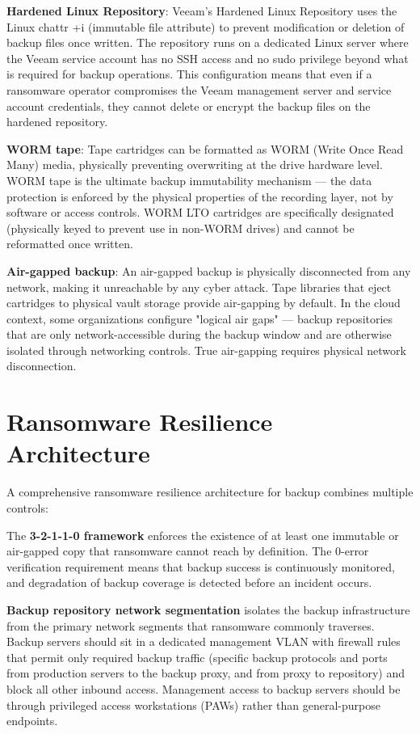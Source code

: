 \textbf{Hardened Linux Repository}: Veeam's Hardened Linux Repository uses the Linux chattr +i (immutable file attribute) to prevent modification or deletion of backup files once written. The repository runs on a dedicated Linux server where the Veeam service account has no SSH access and no sudo privilege beyond what is required for backup operations. This configuration means that even if a ransomware operator compromises the Veeam management server and service account credentials, they cannot delete or encrypt the backup files on the hardened repository.

\textbf{WORM tape}: Tape cartridges can be formatted as WORM (Write Once Read Many) media, physically preventing overwriting at the drive hardware level. WORM tape is the ultimate backup immutability mechanism --- the data protection is enforced by the physical properties of the recording layer, not by software or access controls. WORM LTO cartridges are specifically designated (physically keyed to prevent use in non-WORM drives) and cannot be reformatted once written.

\textbf{Air-gapped backup}: An air-gapped backup is physically disconnected from any network, making it unreachable by any cyber attack. Tape libraries that eject cartridges to physical vault storage provide air-gapping by default. In the cloud context, some organizations configure "logical air gaps" --- backup repositories that are only network-accessible during the backup window and are otherwise isolated through networking controls. True air-gapping requires physical network disconnection.

\section{Ransomware Resilience Architecture}
A comprehensive ransomware resilience architecture for backup combines multiple controls:

The \textbf{3-2-1-1-0 framework} enforces the existence of at least one immutable or air-gapped copy that ransomware cannot reach by definition. The 0-error verification requirement means that backup success is continuously monitored, and degradation of backup coverage is detected before an incident occurs.

\textbf{Backup repository network segmentation} isolates the backup infrastructure from the primary network segments that ransomware commonly traverses. Backup servers should sit in a dedicated management VLAN with firewall rules that permit only required backup traffic (specific backup protocols and ports from production servers to the backup proxy, and from proxy to repository) and block all other inbound access. Management access to backup servers should be through privileged access workstations (PAWs) rather than general-purpose endpoints.

